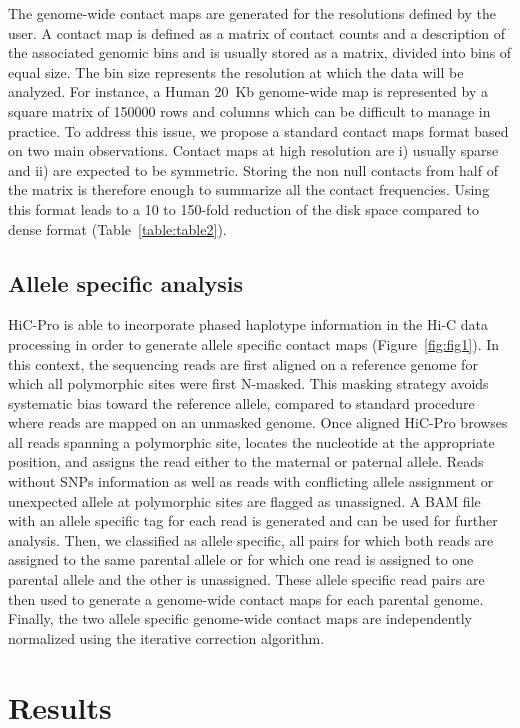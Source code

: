 The genome-wide contact maps are generated for the resolutions defined by the
user. A contact map is defined as a matrix of contact counts and a description
of the associated genomic bins and is usually stored as a matrix, divided into
bins of equal size. The bin size represents the resolution at which the data
will be analyzed. For instance, a Human 20~Kb genome-wide map is represented by
a square matrix of 150000 rows and columns which can be difficult to manage in
practice. To address this issue, we propose a standard contact maps format
based on two main observations. Contact maps at high resolution are i) usually
sparse and ii) are expected to be symmetric. Storing the non null contacts
from half of the matrix is therefore enough to summarize all the contact
frequencies. Using this format leads to a 10 to 150-fold reduction of the disk
space compared to dense format (Table~\ref{table:table2}).

\subsection{Allele specific analysis}

HiC-Pro is able to incorporate phased haplotype information in the Hi-C data
processing in order to generate allele specific contact maps
(Figure~\ref{fig:fig1}). In this context, the sequencing reads are first
aligned on a reference genome for which all polymorphic sites were first
N-masked. This masking strategy avoids systematic bias toward the reference
allele, compared to standard procedure where reads are mapped on an unmasked
genome. Once aligned HiC-Pro browses all reads spanning a polymorphic site,
locates the nucleotide at the appropriate position, and assigns the read
either to the maternal or paternal allele. Reads without SNPs information as
well as reads with conflicting allele assignment or unexpected allele at
polymorphic sites are flagged as unassigned. A BAM file with an allele
specific tag for each read is generated and can be used for further analysis.
Then, we classified as allele specific, all pairs for which both reads are
assigned to the same parental allele or for which one read is assigned to one
parental allele and the other is unassigned. These allele specific read pairs
are then used to generate a genome-wide contact maps for each parental genome.
Finally, the two allele specific genome-wide contact maps are independently
normalized using the iterative correction algorithm.

\section{Results}


